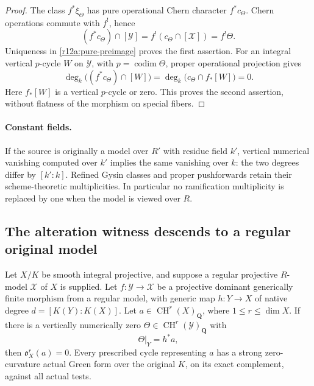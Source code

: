 \begin{proof}
The class $f^*\xi_\Theta$ has pure operational Chern character
$f^*c_\Theta$.  Chern operations commute with $f^!$, hence
\[
 (f^*c_\Theta)\cap[\mathcal Y]
       = f^!(c_\Theta\cap[\mathcal X])=f^!\Theta.
\]
Uniqueness in \eqref{r12a:pure-preimage} proves the first assertion.
For an integral vertical $p$-cycle $W$ on $\mathcal Y$, with
$p=\operatorname{codim}\Theta$, proper operational projection gives
\[
 \deg_k\bigl((f^*c_\Theta)\cap[W]\bigr)
       =\deg_k\bigl(c_\Theta\cap f_*[W]\bigr)=0.
\]
Here $f_*[W]$ is a vertical $p$-cycle or zero.  This proves the second
assertion, without flatness of the morphism on special fibers.
\end{proof}

\paragraph{Constant fields.}
If the source is originally a model over $R'$ with residue field $k'$,
vertical numerical vanishing computed over $k'$ implies the same
vanishing over $k$: the two degrees differ by $[k':k]$.  Refined Gysin
classes and proper pushforwards retain their scheme-theoretic
multiplicities.  In particular no ramification multiplicity is replaced
by one when the model is viewed over $R$.

\subsection{The alteration witness descends to a regular original model}

\begin{theorem}
\label{r12a:regular-target}
Let $X/K$ be smooth integral projective, and suppose a regular
projective $R$-model $\mathcal X$ of $X$ is supplied.  Let
$f:\mathcal Y\to\mathcal X$ be a projective dominant generically finite
morphism from a regular model, with generic map $h:Y\to X$ of native
degree $d=[K(Y):K(X)]$.  Let $a\in\operatorname{CH}^r(X)_{\mathbf Q}$,
where $1\le r\le\dim X$.
If there is a vertically numerically zero
$\Theta\in\operatorname{CH}^r(\mathcal Y)_{\mathbf Q}$ with
\[
                              \Theta|_Y=h^*a,
\tag{ND4}\label{r12a:witness-generic}
\]
then $\mathfrak o_X^r(a)=0$.  Every prescribed cycle representing
$a$ has a strong zero-curvature actual Green form over the original
$K$, on its exact complement, against all actual tests.
\end{theorem}

